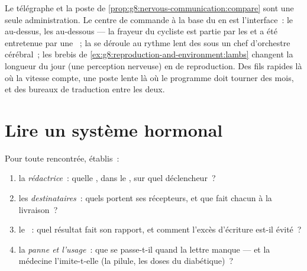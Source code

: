 \begin{remark}\label{rem:g8:hormonal-communication:partnership}
Le télégraphe et la poste de
\cref{prop:g8:nervous-communication:compare} sont une seule
administration. Le centre de commande à la base du 
en est l'interface~: le  au-dessus, les
 au-dessous --- la frayeur du cycliste est partie
par les  et a été entretenue par une ~; la
 se déroule au rythme lent des  sous un chef
d'orchestre cérébral~; les brebis de
\cref{ex:g8:reproduction-and-environment:lambs} changent la
longueur du jour (une perception nerveuse) en  de
reproduction. Des fils rapides là où la vitesse compte, une
poste lente là où le programme doit tourner des mois, et des
bureaux de traduction entre les deux.
\end{remark}

\section{Lire un système hormonal}

\begin{method}\label{met:g8:hormonal-communication:read}
Pour toute  rencontrée, établis~:
\begin{enumerate}
  \item la \emph{rédactrice}~: quelle , dans le ,
        sur quel déclencheur~?
  \item les \emph{destinataires}~: quels 
        portent ses récepteurs, et que fait chacun à la
        livraison~?
  \item le \emph{}~: quel résultat fait son
        rapport, et comment l'excès d'écriture est-il évité~?
  \item la \emph{panne et l'usage}~: que se passe-t-il quand
        la lettre manque --- et la médecine l'imite-t-elle
        (la pilule, les doses du diabétique)~?
\end{enumerate}
\end{method}

